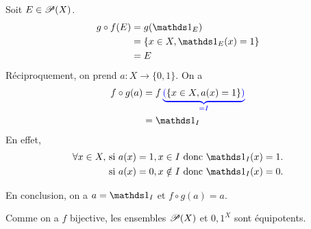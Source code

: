 {\begin{nntd-sol}[]
\begin{enumerate}
            Soit \(E\in\mathscr{P}(X)\).
            \begin{equation*}
                \begin{aligned}
                    g\circ f(E)
                    &=g(\one_E)\\
                    &=\left\{x\in X,\one_E(x)=1\right\}\\
                    &= E
                \end{aligned}
            \end{equation*}
            Réciproquement, on prend \(a\colon X\to\{0,1\}\). On a
            \begin{equation*}
                \begin{aligned}
                    f\circ g(a)
                    &= f
                        \color{blue}
                        \underbrace{\left(\color{black}\left\{x\in X,a(x)=1\right\}\color{blue}\right)\color{black}}
                        _{\color{blue}=I}
                        \color{black}
                        \\
                    &= \one_I
                \end{aligned}
            \end{equation*}
            En effet,
            \begin{equation*}
                \begin{aligned}
                    \forall x\in X, 
                    &\text{ si } a(x)=1,x\in I \text{ donc } \one_I(x)=1.\\
                    &\text{ si } a(x)=0,x\notin I \text{ donc } \one_I(x)=0.
                \end{aligned}
            \end{equation*}

            En conclusion, on a \(a=\one_I\) et  \(f\circ g(a)=a\).

            Comme on a \(f\) bijective, les ensembles \(\mathscr{P}(X)\) et \({0,1}^X\) sont équipotents.
        \end{enumerate}
    \end{nntd-sol}
}{}

